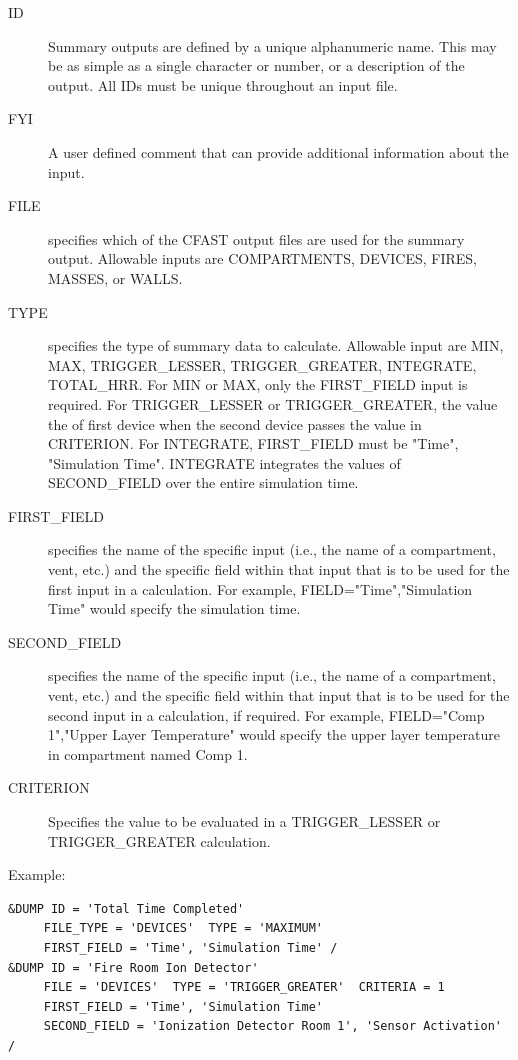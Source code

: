 \documentclass[12pt,twoside]{book}
\begin{document}
\begin{description}
  \item[ID] Summary outputs are defined by a unique alphanumeric name. This may be as simple as a single character or number, or a description of the output. All IDs must be unique throughout an input file.
  \item[FYI] A user defined comment that can provide additional information about the input.
  \item[FILE] specifies which of the CFAST output files are used for the summary output. Allowable inputs are {\ct COMPARTMENTS}, {\ct DEVICES}, {\ct FIRES}, {\ct MASSES}, or {\ct WALLS}.
  \item[TYPE] specifies the type of summary data to calculate. Allowable input are {\ct MIN}, {\ct MAX}, {\ct TRIGGER\_LESSER}, {\ct TRIGGER\_GREATER}, {\ct INTEGRATE}, {\ct TOTAL\_HRR}. For {\ct MIN} or {\ct MAX}, only the {\ct FIRST\_FIELD} input is required. For {\ct TRIGGER\_LESSER} or {\ct TRIGGER\_GREATER}, the value the of first device when the second device passes the value in {\ct CRITERION}. For {\ct INTEGRATE}, {\ct FIRST\_FIELD} must be {\ct "Time", "Simulation Time"}. {\ct INTEGRATE} integrates the values of {\ct SECOND\_FIELD} over the entire simulation time.
  \item[FIRST\_FIELD] specifies the name of the specific input (i.e., the name of a compartment, vent, etc.) and the specific field within that input that is to be used for the first input in a calculation. For example, {\ct FIELD="Time","Simulation Time"} would specify the simulation time.
  \item[SECOND\_FIELD] specifies the name of the specific input (i.e., the name of a compartment, vent, etc.) and the specific field within that input that is to be used for the second input in a calculation, if required. For example, {\ct FIELD="Comp 1","Upper Layer Temperature"} would specify the upper layer temperature in compartment named {\ct Comp 1}.
  \item[CRITERION] Specifies the value to be evaluated in a {\ct TRIGGER\_LESSER} or {\ct TRIGGER\_GREATER} calculation.
\end{description}

\vspace{\baselineskip}
\noindent Example:
\begin{lstlisting}
&DUMP ID = 'Total Time Completed'
     FILE_TYPE = 'DEVICES'  TYPE = 'MAXIMUM'
     FIRST_FIELD = 'Time', 'Simulation Time' /
&DUMP ID = 'Fire Room Ion Detector'
     FILE = 'DEVICES'  TYPE = 'TRIGGER_GREATER'  CRITERIA = 1
     FIRST_FIELD = 'Time', 'Simulation Time'
     SECOND_FIELD = 'Ionization Detector Room 1', 'Sensor Activation' /
\end{lstlisting}
\end{document}
